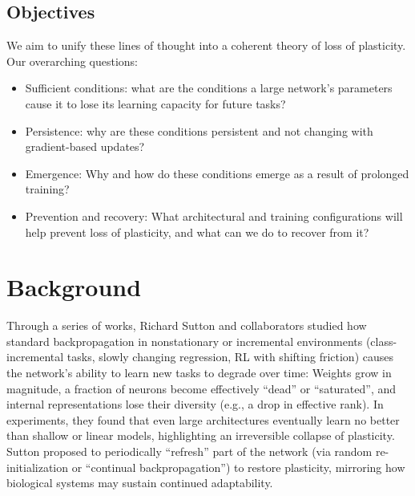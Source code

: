 \documentclass[11pt]{article}
\begin{document}
\subsection{Objectives}
We aim to unify these lines of thought into a coherent theory of loss of plasticity. Our overarching questions:
\begin{itemize}
    \item Sufficient conditions: what are the conditions a large network's parameters cause it to lose its learning capacity for future tasks?
    \item Persistence: why are these conditions persistent and not changing with gradient-based updates?
    \item Emergence: Why and how do these conditions emerge as a result of prolonged training?
    \item Prevention and recovery: What architectural and training configurations will help prevent loss of plasticity, and what can we do to recover from it?
\end{itemize}

\section{Background}

Through a series of works, Richard Sutton and collaborators studied how standard backpropagation in nonstationary or incremental environments (class-incremental tasks, slowly changing regression, RL with shifting friction) causes the network's ability to learn new tasks to degrade over time: Weights grow in magnitude, a fraction of neurons become effectively ``dead'' or ``saturated'', and internal representations lose their diversity (e.g., a drop in effective rank).
In experiments, they found that even large architectures eventually learn no better than shallow or linear models, highlighting an irreversible collapse of plasticity. Sutton proposed to periodically ``refresh'' part of the network (via random re-initialization or ``continual backpropagation'') to restore plasticity, mirroring how biological systems may sustain continued adaptability.
\end{document}
